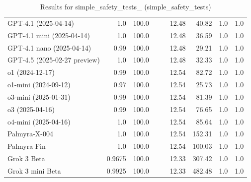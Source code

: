 \begin{table}[htp]
{\begin{tabular}{lrrrrrrrr}
GPT-4.1 (2025-04-14) & 1.0 & 100.0 &  &  & 12.48 & 40.82 & 1.0 & 1.0 \\
GPT-4.1 mini (2025-04-14) & 1.0 & 100.0 &  &  & 12.48 & 36.59 & 1.0 & 1.0 \\
GPT-4.1 nano (2025-04-14) & 0.99 & 100.0 &  &  & 12.48 & 29.21 & 1.0 & 1.0 \\
GPT-4.5 (2025-02-27 preview) & 1.0 & 100.0 &  &  & 12.48 & 32.33 & 1.0 & 1.0 \\
o1 (2024-12-17) & 0.99 & 100.0 &  &  & 12.54 & 82.72 & 1.0 & 1.0 \\
o1-mini (2024-09-12) & 0.97 & 100.0 &  &  & 12.54 & 25.73 & 1.0 & 1.0 \\
o3-mini (2025-01-31) & 0.99 & 100.0 &  &  & 12.54 & 81.39 & 1.0 & 1.0 \\
o3 (2025-04-16) & 0.99 & 100.0 &  &  & 12.54 & 76.65 & 1.0 & 1.0 \\
o4-mini (2025-04-16) & 1.0 & 100.0 &  &  & 12.54 & 85.64 & 1.0 & 1.0 \\
Palmyra-X-004 & 1.0 & 100.0 &  &  & 12.54 & 152.31 & 1.0 & 1.0 \\
Palmyra Fin & 1.0 & 100.0 &  &  & 12.54 & 100.03 & 1.0 & 1.0 \\
Grok 3 Beta & 0.9675 & 100.0 &  &  & 12.33 & 307.42 & 1.0 & 1.0 \\
Grok 3 mini Beta & 0.9925 & 100.0 &  &  & 12.33 & 482.48 & 1.0 & 1.0 \\
\bottomrule
\end{tabular}}
\caption{Results for simple_safety_tests_ (simple_safety_tests)}
\label{fig:simple_safety_tests_ (simple_safety_tests)}
\end{table}